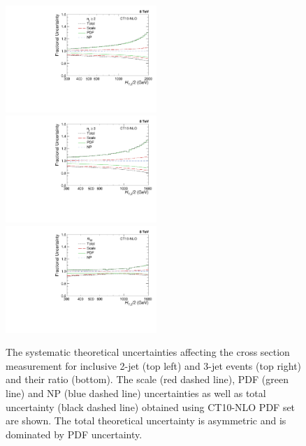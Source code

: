 \begin{figure}[!h]
 \begin{center}
 \hspace*{-5mm}\includegraphics[width=0.51\textwidth]{Plots_HT_2_150/Theory_Unc_2.pdf}%
 ~~\includegraphics[width=0.51\textwidth]{Plots_HT_2_150/Theory_Unc_3.pdf}\\
 \includegraphics[width=0.51\textwidth]{Plots_HT_2_150/Theory_Unc_Ratio_32.pdf}\\  
 \caption{The systematic theoretical uncertainties affecting the cross section measurement for inclusive 2-jet (top left) and 3-jet events (top right) and their ratio \ratio (bottom). The scale (red dashed line), PDF (green line) and NP (blue dashed line) uncertainties as well as total uncertainty (black dashed line) obtained using CT10-NLO PDF set are shown. The total theoretical uncertainty is asymmetric and is dominated by PDF uncertainty.}
 \label{fig:theory_unc}
 \end{center}
\end{figure}

